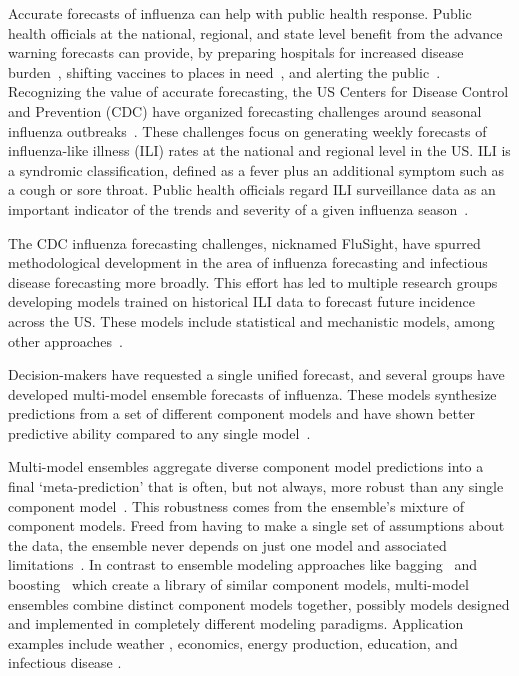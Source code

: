 \documentclass[12pt]{article}
\begin{document}
Accurate forecasts of influenza can help with public health response.
Public health officials at the national, regional, and state level benefit from the advance warning forecasts can provide, by preparing hospitals for increased disease burden~\cite{reed2009infection}, shifting vaccines to places in need~\cite{germann2006mitigation}, and alerting the public~\cite{vaughan2009effective}.
%
Recognizing the value of accurate forecasting, the US Centers for Disease Control and Prevention (CDC) have organized forecasting challenges around seasonal influenza outbreaks~\cite{biggerstaff2016results,biggerstaff2018results,mcgowan2019collaborative}. 
These challenges focus on generating weekly forecasts of influenza-like illness (ILI) rates at the national and regional level in the US. 
ILI is a syndromic classification, defined as a fever plus an additional symptom such as a cough or sore throat.
Public health officials regard ILI surveillance data as an important indicator of the trends and severity of a given influenza season~\cite{biggerstaff2017systematic}.

The CDC influenza forecasting challenges, nicknamed FluSight, have spurred methodological development in the area of influenza forecasting and infectious disease forecasting more broadly.
This effort has led to multiple research groups developing models trained on historical ILI data to forecast future incidence across the US.
These models include statistical and mechanistic models, among other approaches~\cite{shaman2012forecasting,brooks2015flexible,ray2017infectious,osthus2018dynamic}.

Decision-makers have requested a single unified forecast, and several groups have developed multi-model ensemble forecasts of influenza. 
These models synthesize predictions from a set of different component models and have shown better predictive ability compared to any single model~\cite{yamana2017individual,ray2018prediction,reich2019collaborative}.

Multi-model ensembles aggregate diverse component model predictions into a final `meta-prediction' that is often, but not always, more robust than any single component model~\cite{zhou2012ensemble,sewell2008ensemble}.
This robustness comes from the ensemble's mixture of component models.
Freed from having to make a single set of assumptions about the data, the ensemble never depends on just one model and associated limitations~\cite{zhou2012ensemble,sewell2008ensemble}.
In contrast to ensemble modeling approaches like 
bagging~\cite{breiman1996bagging,dietterich2000ensemble} and boosting~\cite{schapire2003boosting,dietterich2000ensemble} which create a library of similar component models, multi-model ensembles combine distinct component models together, possibly models designed and implemented in completely different modeling paradigms. Application examples include weather \cite{krishnamurti1999improved}, economics\cite{garratt2011real}, energy production\cite{pierro2016multi}, education\cite{adejo2018predicting}, and infectious disease \cite{reich2019collaborative}. 
\end{document}
